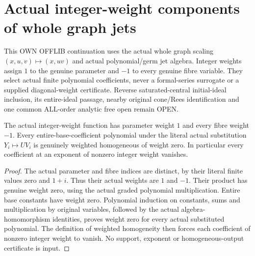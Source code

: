 \section{Actual integer-weight components of whole graph jets}
This OWN OFFLIB continuation uses the actual whole graph scaling $(x,u,v)\mapsto(x,uv)$ and actual polynomial/germ jet algebra. Integer weights assign $1$ to the genuine parameter and $-1$ to every genuine fibre variable. They select actual finite polynomial coefficients, never a formal-series surrogate or a supplied diagonal-weight certificate. Reverse saturated-central initial-ideal inclusion, its entire-ideal passage, nearby original cone/Rees identification and one common ALL-order analytic free open remain OPEN.

\begin{lemma}
\label{hir:relative-normal-graph-weight-substitution-zero}
\leanok
The actual integer-weight function has parameter weight $1$ and every fibre weight $-1$. Every entire-base-coefficient polynomial under the literal actual substitution $Y_i\mapsto UV_i$ is genuinely weighted homogeneous of weight zero. In particular every coefficient at an exponent of nonzero integer weight vanishes.
\end{lemma}
\begin{proof}
The actual parameter and fibre indices are distinct, by their literal finite values zero and $1+i$. Thus their actual weights are $1$ and $-1$. Their product has genuine weight zero, using the actual graded polynomial multiplication. Entire base constants have weight zero. Polynomial induction on constants, sums and multiplication by original variables, followed by the actual algebra-homomorphism identities, proves weight zero for every actual substituted polynomial. The definition of weighted homogeneity then forces each coefficient of nonzero integer weight to vanish. No support, exponent or homogeneous-output certificate is input.
\end{proof}

